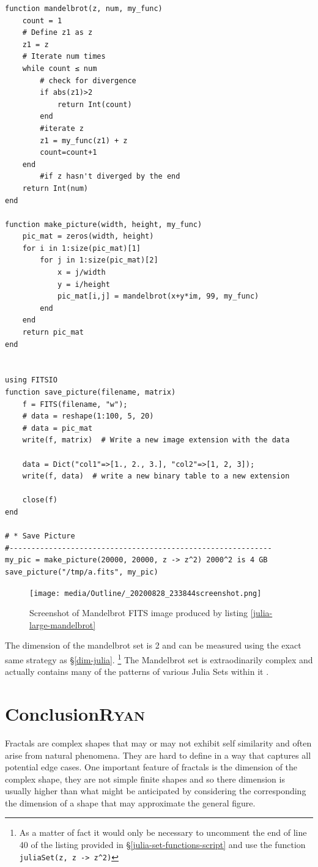 \documentclass[a4paper,11pt,twoside]{article}
\begin{document}
\begin{verbatim}
function mandelbrot(z, num, my_func)
    count = 1
    # Define z1 as z
    z1 = z
    # Iterate num times
    while count ≤ num
        # check for divergence
        if abs(z1)>2
            return Int(count)
        end
        #iterate z
        z1 = my_func(z1) + z
        count=count+1
    end
        #if z hasn't diverged by the end
    return Int(num)
end

function make_picture(width, height, my_func)
    pic_mat = zeros(width, height)
    for i in 1:size(pic_mat)[1]
        for j in 1:size(pic_mat)[2]
            x = j/width
            y = i/height
            pic_mat[i,j] = mandelbrot(x+y*im, 99, my_func)
        end
    end
    return pic_mat
end


using FITSIO
function save_picture(filename, matrix)
    f = FITS(filename, "w");
    # data = reshape(1:100, 5, 20)
    # data = pic_mat
    write(f, matrix)  # Write a new image extension with the data

    data = Dict("col1"=>[1., 2., 3.], "col2"=>[1, 2, 3]);
    write(f, data)  # write a new binary table to a new extension

    close(f)
end

# * Save Picture
#------------------------------------------------------------
my_pic = make_picture(20000, 20000, z -> z^2) 2000^2 is 4 GB
save_picture("/tmp/a.fits", my_pic)

\end{verbatim}

\begin{figure}[htbp]
\centering
\texttt{[image: media/Outline/\_20200828\_233844screenshot.png]}
\caption{\label{mandelbrot-screen}Screenshot of Mandelbrot FITS image produced by listing \ref{julia-large-mandelbrot}}
\end{figure}


The dimension of the mandelbrot set is 2 \cite{bownScienceMandelbrotSet} and can be measured using the exact same strategy as \S \ref{dim-julia}. \footnote{As a matter of fact it would only be necessary to uncomment the end of line 40 of the listing provided in \S \ref{julia-set-functions-script} and use the function \texttt{juliaSet(z, z -> z\textasciicircum{}2)}} The Mandelbrot set is extraodinarily complex and actually contains many of the patterns of various Julia Sets within it \cite[Ch. 14]{peitgenChaosFractalsNew2004}.
\section{Conclusion\hfill{}\textsc{Ryan}}
\label{sec:org355ae46}
Fractals are complex shapes that may or may not exhibit self similarity and often arise from natural phenomena. They are hard to define in a way that captures all potential edge cases. One important feature of fractals is the dimension of the complex shape, they are not simple finite shapes and so there dimension is usually higher than what might be anticipated by considering the corresponding the dimension of a shape that may approximate the general figure.
\end{document}

